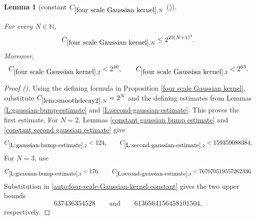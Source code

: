 \documentclass[12pt,reqno]{amsart}
\newcommand{\auto}{{({\tiny\faCar})}}
\theoremstyle{plain}
\newtheorem{lemma}[theorem]{Lemma}
\numberwithin{equation}{section}
\theoremstyle{remark}
\newcommand{\uses}[1]{}
\newcommand{\usesdefs}[1]{}
\newcommand{\leanok}{}
\newcommand{\lean}[1]{}
\newcommand{\N}{{\mathbb N}}
\begin{document}
\begin{lemma}[constant $C_{\ref{four scale Gaussian kernel},N}$ \auto]\label{constant four scale Gaussian kernel}\uses{lem:smoothdecay2,L:gaussian-bump-estimate,L:second-gaussian-estimate,constant gaussian bump estimate,constant second gaussian estimate,four scale Gaussian kernel}\usesdefs{}
\lean{Auto.constantFourScaleGaussianKernel}
\leanok
For every $N\in\N$,
\begin{equation}\label{constant four scale Gaussian kernel bound}
C_{\ref{four scale Gaussian kernel},N}\le2^{25(N+1)^3}.
\end{equation}
Moreover,
\begin{equation}\label{auto:constant-four-scale-Gaussian-kernel-small}
C_{\ref{four scale Gaussian kernel},2}<2^{40},
\qquad
C_{\ref{four scale Gaussian kernel},3}<2^{63}.
\end{equation}
\end{lemma}
\begin{proof}[Proof \auto]
Using the defining formula in Proposition \ref{four scale Gaussian kernel}, substitute $C_{\ref{lem:smoothdecay2},N}=2^N$ and the defining estimates from Lemmas \ref{L:gaussian-bump-estimate} and \ref{L:second-gaussian-estimate}. This proves the first estimate. For $N=2$, Lemmas \ref{constant gaussian bump estimate} and \ref{constant second gaussian estimate} give
\[
C_{\ref{L:gaussian-bump-estimate},2}<124,
\qquad
C_{\ref{L:second-gaussian-estimate},2}<159359088384.
\]
For $N=3$, use
\[
C_{\ref{L:gaussian-bump-estimate},3}<176,
\qquad
C_{\ref{L:second-gaussian-estimate},3}<767070519557262336.
\]
Substitution in \eqref{auto:four-scale-Gaussian-kernel-constant} gives the two upper bounds
\[
637436354528
\qquad\text{and}\qquad
6136564156458101504,
\]
respectively.
\end{proof}
\end{document}
